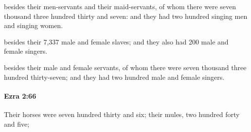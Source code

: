			\begin{versebox}
					\item[BHS] 
					\item[LXX] 
					\item[ASV] besides their men-servants and their maid-servants, of whom there were seven thousand three hundred thirty and seven: and they had two hundred singing men and singing women.
					\item[NIV] besides their 7,337 male and female slaves; and they also had 200 male and female singers.
					\item[NRSV] besides their male and female servants, of whom there were seven thousand three hundred thirty-seven; and they had two hundred male and female singers.
			\end{versebox}

		\paragraph{Ezra 2:66} %
			\label{EZRA-2-66}

			Their horses were seven hundred thirty and six; their mules, two hundred forty and five;

